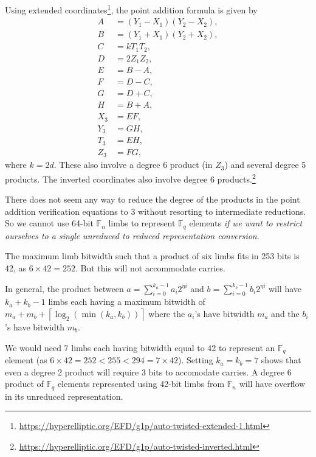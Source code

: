 \documentclass[a4paper, 12pt]{article}
\begin{document}
Using extended coordinates\footnote{\url{https://hyperelliptic.org/EFD/g1p/auto-twisted-extended-1.html}}, the point addition formula is given by
\begin{align*}
  A & = (Y_1-X_1)(Y_2-X_2),\\
  B & = (Y_1+X_1)(Y_2+X_2),\\
  C & = kT_1T_2,\\
  D & = 2Z_1Z_2,\\
  E & = B-A,\\
  F & = D-C,\\
  G & = D+C,\\
  H & = B+A,\\
  X_3 & = EF,\\
  Y_3 & = GH,\\
  T_3 & = EH,\\
  Z_3 & = FG,
\end{align*}
where $k=2d$. These also involve a degree 6 product (in $Z_3$) and several degree 5 products. The inverted coordinates also involve degree 6 products.\footnote{\url{https://hyperelliptic.org/EFD/g1p/auto-twisted-inverted.html}}

There does not seem any way to reduce the degree of the products in the point addition verification equations to 3 without resorting to intermediate reductions. So we cannot use 64-bit $\mathbb{F}_n$ limbs to represent $\mathbb{F}_q$ elements \textit{if we want to restrict ourselves to a single unreduced to reduced representation conversion}.

The maximum limb bitwidth such that a product of six limbs fits in 253 bits is 42, as $6\times 42 = 252$. But this will not accommodate carries.

In general, the product between $a = \sum_{i=0}^{k_a-1}a_i 2^{\eta i}$ and $b= \sum_{i=0}^{k_b-1}b_i 2^{\eta i}$ will have $k_a+k_b-1$ limbs each having a maximum bitwidth of $m_a+m_b+\left\lceil \log_2 \left( \min\left( k_a, k_b \right) \right) \right\rceil$ where the $a_i$'s have bitwidth $m_a$ and the $b_i$'s have bitwidth $m_b$.

We would need 7 limbs each having bitwidth equal to 42 to represent an $\mathbb{F}_q$ element (as $6\times 42 = 252 < 255 < 294 = 7\times 42$). Setting $k_a=k_b =7$ shows that even a degree 2 product will require 3 bits to accomodate carries. A degree 6 product of $\mathbb{F}_q$ elements represented using 42-bit limbs from $\mathbb{F}_n$ will have overflow in its unreduced representation.
\end{document}
